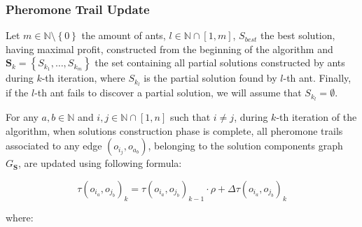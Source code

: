 \documentclass[12pt,a4paper]{report}
\newcommand{\N}{\mathbb{N}}
\newcommand{\SetMinusZero}{\setminus \left\{0\right\}}
\newcommand{\SetFromOneTo}[1]{\N \cap \left[1,#1\right]}
\begin{document}
\subsubsection{Pheromone Trail Update}

Let $m \in \N \SetMinusZero$ the amount of ants, $l \in \SetFromOneTo{m}$, $S_{best}$ the best solution, having maximal profit, constructed from the beginning of the algorithm and $\textbf{S}_k = \left\{S_{k_1}, \ldots, S_{k_m} \right\}$ the set containing all partial solutions constructed by ants during $k$-th iteration, where $S_{k_l}$ is the partial solution found by $l$-th ant. Finally, if the $l$-th ant fails to discover a partial solution, we will assume that $S_{k_l} = \emptyset$. 

For any $a,b \in \N$ and $i,j \in \SetFromOneTo{n}$ such that $i \neq j$, during $k$-th iteration of the algorithm, when solutions construction phase is complete, all pheromone trails associated to any edge $(o_{i_j}, o_{a_b})$, belonging to the solution components graph $G_{\textbf{S}}$, are updated using following formula:

\begin{equation}
	\tau(o_{i_a}, o_{j_b})_k = \tau(o_{i_a}, o_{j_b})_{k-1} \cdot \rho + \Delta \tau(o_{i_a}, o_{j_b})_{k} 
\end{equation}

where:
\end{document}
